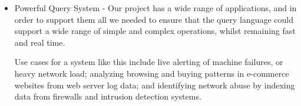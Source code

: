 \begin{itemize}
\item Powerful Query System - Our project has a wide range of applications, and
in order to support them all we needed to ensure that the query language could
support a wide range of simple and complex operations, whilst remaining fast
and real time.

Use cases for a system like this include live alerting of machine failures, or
heavy network load; analyzing browsing and buying patterns in e-commerce
websites from web server log data; and identifying network abuse by indexing
data from firewalls and intrusion detection systems.

\end{itemize}
